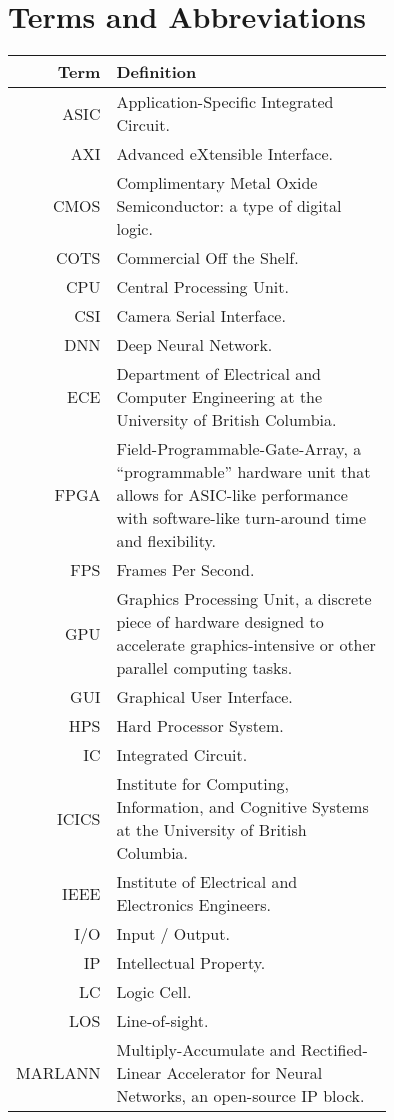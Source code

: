 \section*{Terms and Abbreviations}

\begin{tabular}[h]{rp{0.75\linewidth}}
    \hline
    \textbf{Term} & \textbf{Definition}\\
    \hline

    ASIC & Application-Specific Integrated Circuit.\\
    AXI & Advanced eXtensible Interface. \\
    CMOS & Complimentary Metal Oxide Semiconductor: a type of digital logic. \\
    COTS & Commercial Off the Shelf.\\
    CPU & Central Processing Unit. \\
    CSI & Camera Serial Interface. \\
    DNN & Deep Neural Network. \\
    ECE & Department of Electrical and Computer Engineering at the University of British Columbia.\\
    FPGA & Field-Programmable-Gate-Array, a ``programmable'' hardware unit that allows for ASIC-like performance with software-like turn-around time and flexibility.\\
    FPS & Frames Per Second.\\
    GPU & Graphics Processing Unit, a discrete piece of hardware designed to accelerate graphics-intensive or other parallel computing tasks.\\
    GUI & Graphical User Interface. \\
    HPS & Hard Processor System. \\
    IC & Integrated Circuit. \\
    ICICS & Institute for Computing, Information, and Cognitive Systems at the University of British Columbia.\\
    IEEE & Institute of Electrical and Electronics Engineers. \\
    I/O & Input / Output. \\
    IP & Intellectual Property. \\
    LC & Logic Cell. \\
    LOS & Line-of-sight.\\
    MARLANN & Multiply-Accumulate and Rectified-Linear Accelerator for Neural Networks, an open-source IP block. \\

\end{tabular}
